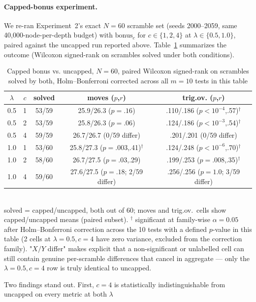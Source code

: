 \documentclass[10pt,conference]{article}
\begin{document}
\paragraph{Capped-bonus experiment.} We re-ran Experiment~2's exact
$N=60$ scramble set (seeds 2000--2059, same 40{,}000-node-per-depth
budget) with $\mathrm{bonus}_c$ for $c \in \{1, 2, 4\}$ at
$\lambda \in \{0.5, 1.0\}$, paired against the uncapped run reported
above. Table~\ref{tab:capped-bonus} summarizes the outcome (Wilcoxon
signed-rank on scrambles solved under both conditions).
\begin{table}[h]
\centering
\footnotesize
\caption{Capped bonus vs. uncapped, $N=60$, paired Wilcoxon
signed-rank on scrambles solved by both, Holm--Bonferroni corrected
across all $m=10$ tests in this table}
\label{tab:capped-bonus}
\begin{tabular}{ccccc}
\toprule
$\lambda$ & $c$ & solved & moves ($p$,$r$) & trig.ov. ($p$,$r$) \\
\midrule
0.5 & 1 & 53/59 & 25.9/26.3 ($p{=}.16$) & .110/.186 ($p{<}10^{-4}$,.57)$^\dagger$ \\
0.5 & 2 & 53/59 & 25.8/26.3 ($p{=}.06$) & .124/.186 ($p{<}10^{-3}$,.54)$^\dagger$ \\
0.5 & 4 & 59/59 & 26.7/26.7 (0/59 differ) & .201/.201 (0/59 differ) \\
1.0 & 1 & 53/60 & 25.8/27.3 ($p{=}.003$,.41)$^\dagger$ & .124/.248 ($p{<}10^{-6}$,.70)$^\dagger$ \\
1.0 & 2 & 58/60 & 26.7/27.5 ($p{=}.03$,.29) & .199/.253 ($p{=}.008$,.35)$^\dagger$ \\
1.0 & 4 & 59/60 & 27.6/27.5 ($p{=}.18$; 2/59 differ) & .256/.256 ($p{=}1.0$; 3/59 differ) \\
\bottomrule
\end{tabular}
\\[2pt]
{\scriptsize solved = capped/uncapped, both out of 60; moves and
trig.ov.\ cells show capped/uncapped means (paired subset).
$^\dagger$ significant at family-wise $\alpha=0.05$ after
Holm--Bonferroni correction across the 10 tests with a defined
$p$-value in this table (2 cells at $\lambda{=}0.5,c{=}4$ have zero
variance, excluded from the correction family). "$X/Y$ differ" makes
explicit that a non-significant or unlabelled cell can still contain
genuine per-scramble differences that cancel in aggregate --- only
the $\lambda{=}0.5,c{=}4$ row is truly identical to uncapped.}
\end{table}
Two findings stand out. First, $c=4$ is statistically
indistinguishable from uncapped on every metric at both $\lambda$
\end{document}
